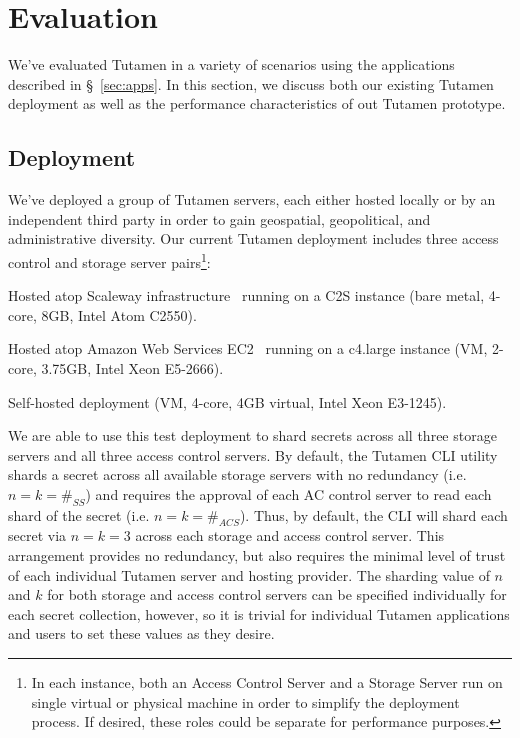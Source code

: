 \section{Evaluation}
\label{sec:eval}

We've evaluated Tutamen in a variety of scenarios using the
applications described in \S~\ref{sec:apps}. In this section, we
discuss both our existing Tutamen deployment as well as the
performance characteristics of out Tutamen prototype.

\subsection{Deployment}
\label{sec:eval:deployment}

We've deployed a group of Tutamen servers, each either hosted locally
or by an independent third party in order to gain geospatial,
geopolitical, and administrative diversity. Our current Tutamen
deployment includes three access control and storage server
pairs\footnote{In each instance, both an Access Control Server and a
  Storage Server run on single virtual or physical machine in order to
  simplify the deployment process. If desired, these roles could be
  separate for performance purposes.}:

\begin{packed_desc}
\item[Paris, France:] Hosted atop Scaleway
  infrastructure~\cite{scaleway} running on a C2S instance (bare
  metal, 4-core, 8GB, Intel Atom C2550).
\item[North Virginia:] Hosted atop Amazon Web Services
  EC2~\cite{amazon-ec2} running on a c4.large instance (VM, 2-core,
  3.75GB, Intel Xeon E5-2666).
\item[Boulder, CO:] Self-hosted deployment (VM, 4-core, 4GB virtual,
  Intel Xeon E3-1245).
\end{packed_desc}

We are able to use this test deployment to shard secrets across all
three storage servers and all three access control servers. By
default, the Tutamen CLI utility shards a secret across all available
storage servers with no redundancy (i.e. $n=k=\#_{SS}$) and requires
the approval of each AC control server to read each shard of the
secret (i.e. $n=k=\#_{ACS}$). Thus, by default, the CLI will shard
each secret via $n=k=3$ across each storage and access control
server. This arrangement provides no redundancy, but also requires the
minimal level of trust of each individual Tutamen server and hosting
provider. The sharding value of $n$ and $k$ for both storage and
access control servers can be specified individually for each secret
collection, however, so it is trivial for individual Tutamen
applications and users to set these values as they desire.

